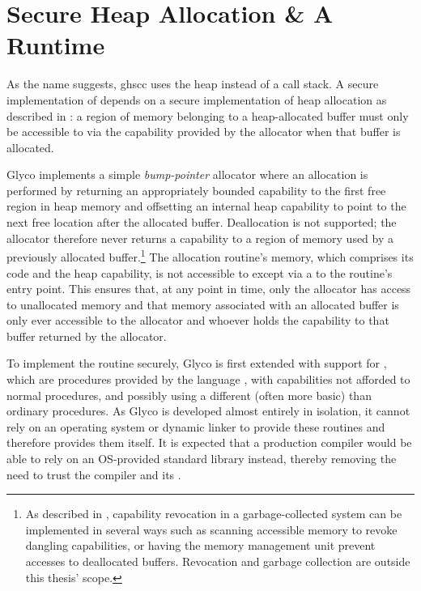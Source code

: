 \documentclass[main.tex]{subfiles}
\begin{document}
\section{Secure Heap Allocation \& A Runtime}
As the name suggests, \acrlong{ghscc} uses the heap instead of a call stack. A secure implementation of  depends on a secure implementation of heap allocation as described in \cite[section~7.1]{cerise}: a region of memory belonging to a heap-allocated buffer must only be accessible to  via the capability provided by the allocator when that buffer is allocated.

Glyco implements a simple \emph{bump-pointer} allocator where an allocation is performed by returning an appropriately bounded capability to the first free region in heap memory and offsetting an internal heap capability to point to the next free location after the allocated buffer. Deallocation is not supported; the allocator therefore never returns a capability to a region of memory used by a previously allocated buffer.\footnote{As described in \cite[section~2.3.16]{cheri}, capability revocation in a garbage-collected system can be implemented in several ways such as scanning accessible memory to revoke dangling capabilities, or having the memory management unit prevent accesses to deallocated buffers. Revocation and garbage collection are outside this thesis' scope.} The allocation routine's memory, which comprises its code and the heap capability, is not accessible to  except via a  to the routine's entry point. This ensures that, at any point in time, only the allocator has access to unallocated memory and that memory associated with an allocated buffer is only ever accessible to the allocator and whoever holds the capability to that buffer returned by the allocator.

To implement the routine securely, Glyco is first extended with support for , which are procedures provided by the language , with capabilities not afforded to normal procedures, and possibly using a different (often more basic)  than ordinary procedures. As Glyco is developed almost entirely in isolation, it cannot rely on an operating system or dynamic linker to provide these routines and therefore provides them itself. It is expected that a production compiler would be able to rely on an OS-provided standard library instead, thereby removing the need to trust the compiler and its .

\end{document}
